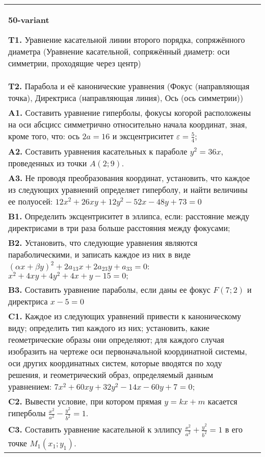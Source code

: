 \documentclass{article}
\begin{document}
\begin{tabular}{m{17cm}}
\textbf{50-variant}
\newline

\textbf{T1.} Уравнение касательной линии второго порядка, сопряжённого диаметра (Уравнение касательной, сопряжённый диаметр: оси симметрии, проходящие через центр) \\
\textbf{T2.} Парабола и её канонические уравнения (Фокус (направляющая точка), Директриса (направляющая линия), Ось (ось симметрии)) \\
\textbf{A1.} Составить уравнение гиперболы, фокусы когорой расположены на оси абсцисс симметрично относительно начала координат, зная, кроме того, что: ось $2 a=16$ и эксцентриситет $\varepsilon=\frac{5}{4}$; \\
\textbf{A2.} Составить уравнения касательных к параболе $y^2=36 x$, проведенных из точки $A(2 ; 9)$. \\
\textbf{A3.} Не проводя преобразования координат, установить, что каждое из следующих уравнений определяет гиперболу, и найти величины ее полуосей: $12 x^2+26 x y+12 y^2-52 x-48 y+73=0$ \\
\textbf{B1.} Определить эксцентриситет в эллипса, если: расстояние между директрисами в три раза больше расстояния между фокусами; \\
\textbf{B2.} Установить, что следующие уравнения являются параболическими, и записать каждое из них в виде $(\alpha x+\beta y)^2+2 a_{13} x+2 a_{23} y+a_{33}=0$: $x^2+4 x y+4 y^2+4 x+y-15=0 ;$ \\
\textbf{B3.} Составить уравнение параболы, если даны ее фокус $F(7 ; 2)$ и директриса $x-5=0$ \\
\textbf{C1.} Каждое из следующих уравнений привести к каноническому виду; определить тип каждого из них; установить, какие геометрические образы они определяют; для каждого случая изобразить на чертеже оси первоначальной координатной системы, оси других координатных систем, которые вводятся по ходу решения, и геометрический образ, определяемый данным уравнением: $7 x^2+60 x y+32 y^2-14 x-60 y+7=0$; \\
\textbf{C2.} Вывести условие, при котором прямая $y=k x+m$ касается гиперболы $\frac{x^2}{a^2}-\frac{y^2}{b^2}=1$. \\
\textbf{C3.} Составить уравнение касательной к эллипсу $\frac{x^2}{a^2}+\frac{y^2}{b^2}=1$ в его точке $M_1\left(x_1 ; y_1\right)$. \\

\end{tabular}
\vspace{1cm}
\end{document}
